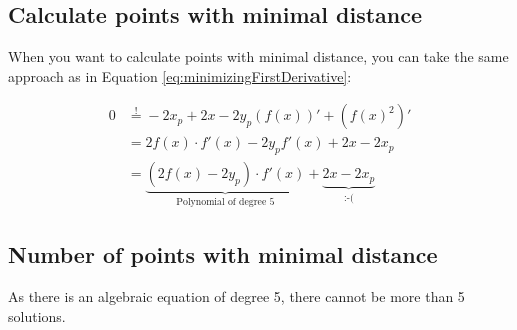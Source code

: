 \documentclass[a4paper]{scrartcl}
\theoremstyle{break}
\theoremstyle{nonumberplain}
\begin{document}
\subsection{Calculate points with minimal distance}
When you want to calculate points with minimal distance, you can 
take the same approach as in Equation \ref{eq:minimizingFirstDerivative}:

\begin{align}
    0  &\stackrel{!}{=} -2 x_p + 2x -2y_p(f(x))' + (f(x)^2)'\\
       &= 2 f(x) \cdot f'(x) - 2 y_p f'(x) + 2x - 2 x_p\\
       &= \underbrace{\left (2 f(x) - 2 y_p \right ) \cdot f'(x)}_{\text{Polynomial of degree 5}} + \underbrace{2x - 2 x_p}_{\text{:-(}}
\end{align}

\subsection{Number of points with minimal distance}
As there is an algebraic equation of degree 5, there cannot be more
than 5 solutions.
\end{document}
